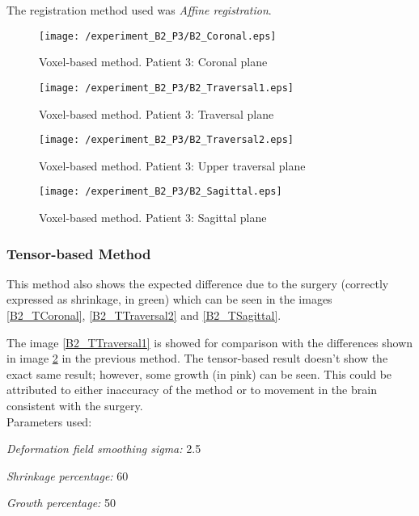 The registration method used was \textit{Affine registration}.

\begin{figure}[H]
  \centering
  \texttt{[image: /experiment\_B2\_P3/B2\_Coronal.eps]}
  \caption{Voxel-based method. Patient 3: Coronal plane}
  \label{B2_Coronal}
\end{figure}

\begin{figure}[H]
  \centering
  \texttt{[image: /experiment\_B2\_P3/B2\_Traversal1.eps]}
  \caption{Voxel-based method. Patient 3: Traversal plane}
  \label{B2_Traversal1}
\end{figure}

\begin{figure}[H]
  \centering
  \texttt{[image: /experiment\_B2\_P3/B2\_Traversal2.eps]}
  \caption{Voxel-based method. Patient 3: Upper traversal plane}
  \label{B2_Traversal2}
\end{figure}

\begin{figure}[H]
  \centering
  \texttt{[image: /experiment\_B2\_P3/B2\_Sagittal.eps]}
  \caption{Voxel-based method. Patient 3: Sagittal plane}
  \label{B2_Sagittal}
\end{figure}


\subsubsection{Tensor-based Method}
This method also shows the expected difference due to the surgery
(correctly expressed as shrinkage, in green) which can be seen in the
images \ref{B2_TCoronal}, \ref{B2_TTraversal2} and \ref{B2_TSagittal}.

The image \ref{B2_TTraversal1} is showed for comparison with the
differences shown in image \ref{B2_Traversal1} in the previous
method. The tensor-based result doesn't show the exact same result;
however, some growth (in pink) can be seen. This could be attributed
to either inaccuracy of the method or to movement in the brain
consistent with the surgery.\\

Parameters used:
\begin{description}
\item \textit{Deformation field smoothing sigma:} 2.5
\item \textit{Shrinkage percentage:} 60
\item \textit{Growth percentage:} 50
\end{description}

